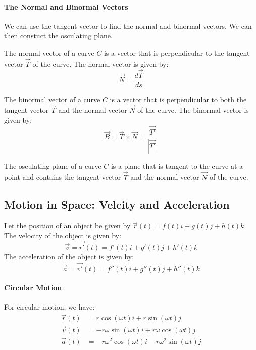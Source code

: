 \documentclass[11pt]{report}
\begin{document}
\paragraph{The Normal and Binormal Vectors} We can use the tangent vector to find the normal and binormal vectors. We can then constuct the osculating plane.
\begin{definition}
    The normal vector of a curve $C$ is a vector that is perpendicular to the tangent vector $\vec{T}$ of the curve. The normal vector is given by:
    \begin{equation}
        \vec{N} = \frac{d\vec{T}}{ds}
    \end{equation}
\end{definition}
\begin{definition}
    The binormal vector of a curve $C$ is a vector that is perpendicular to both the tangent vector $\vec{T}$ and the normal vector $\vec{N}$ of the curve. The binormal vector is given by:
    \begin{equation}
        \vec{B} = \vec{T} \times \vec{N} = \frac{\vec{T'}}{|\vec{T'}|}
    \end{equation}
\end{definition}
\begin{definition}
    The osculating plane of a curve $C$ is a plane that is tangent to the curve at a point and contains the tangent vector $\vec{T}$ and the normal vector $\vec{N}$ of the curve.
\end{definition}
\subsection{Motion in Space: Velcity and Acceleration}
\begin{definition}
    Let the position of an object be given by $\vec{r}(t) = f(t)i + g(t)j + h(t)k$. The velocity of the object is given by:
    \begin{equation}
        \vec{v} = \vec{r'}(t) = f'(t)i + g'(t)j + h'(t)k
    \end{equation}
    The acceleration of the object is given by:
    \begin{equation}
        \vec{a} = \vec{v'}(t) = f''(t)i + g''(t)j + h''(t)k
    \end{equation}
\end{definition}
\paragraph{Circular Motion} For circular motion, we have:
\begin{align}
    \vec{r}(t) &= r\cos(\omega t)i + r\sin(\omega t)j \\
    \vec{v}(t) &= -r\omega\sin(\omega t)i + r\omega\cos(\omega t)j \\
    \vec{a}(t) &= -r\omega^2\cos(\omega t)i - r\omega^2\sin(\omega t)j
\end{align}
\end{document}

